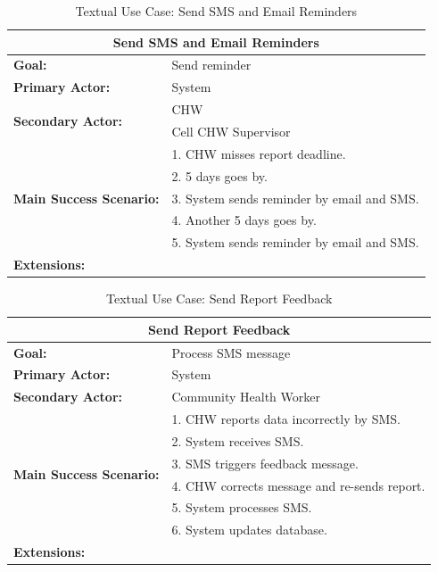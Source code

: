 \begin{table}
	\centering
	\begin{tabular}{|p{5cm}|p{7cm}|}
		\hline
		\multicolumn{2}{|c|}{\textbf{Send SMS and Email Reminders}}\\
		\hline
		\textbf{Goal:} & Send reminder \\
		\hline
		\textbf{Primary Actor:} & System \\
		\hline
		\multirow{2}{*}{\textbf{Secondary Actor:}}	& CHW \\
																								& Cell CHW Supervisor \\
		\hline
		\multirow{5}{*}{\textbf{Main Success Scenario:}}	& 1. CHW misses report deadline. \\
																											& 2. 5 days goes by. \\
																											& 3. System sends reminder by email and SMS. \\
																											& 4. Another 5 days goes by. \\
																											& 5. System sends reminder by email and SMS. \\
																											
		\hline
		\textbf{Extensions:} & \\
		\hline
	\end{tabular}
	\caption{Textual Use Case: Send SMS and Email Reminders}
	\label{tab:reminders}
\end{table}


\begin{table}
	\centering
	\begin{tabular}{|p{5cm}|p{7cm}|}
		\hline
		\multicolumn{2}{|c|}{\textbf{Send Report Feedback}} \\
		\hline
		\textbf{Goal:} & Process SMS message\\
		\hline
		\textbf{Primary Actor:} & System \\
		\hline
		\textbf{Secondary Actor:} & Community Health Worker \\
		\hline
		\multirow{6}{*}{\textbf{Main Success Scenario:}}	& 1. CHW reports data incorrectly by SMS. \\
																											& 2. System receives SMS. \\
																											& 3. SMS triggers feedback message. \\
																											& 4. CHW corrects message and re-sends report. \\
																											& 5. System processes SMS. \\
																											& 6. System updates database. \\
		\hline
		\textbf{Extensions:} & \\
		\hline
	\end{tabular}
	\caption{Textual Use Case: Send Report Feedback}
	\label{tab:feedback}
\end{table}

